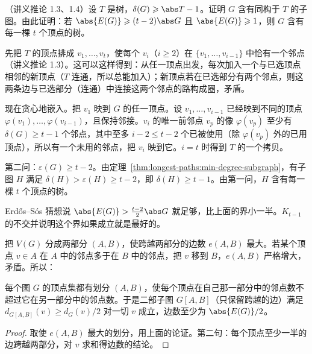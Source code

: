 \begin{workedexample}\label{we:longest-paths:tree-embedding}
（讲义推论 1.3、1.4）设 $T$ 是树，$\delta(G)\geqslant\abs T-1$。证明 $G$ 含有同构于 $T$ 的子图。由此证明：若 $\abs{E(G)}\geqslant(t-2)\abs G$ 且 $\abs{E(G)}\geqslant1$，则 $G$ 含有每一棵 $t$ 个顶点的树。
\end{workedexample}
\begin{solution}
先把 $T$ 的顶点排成 $v_1,\dots,v_t$，使每个 $v_i$（$i\geqslant2$）在 $\{v_1,\dots,v_{i-1}\}$ 中恰有一个邻点（讲义推论 1.3）。这可以这样得到：从任一顶点出发，每次加入一个与已选顶点相邻的新顶点（$T$ 连通，所以总能加入）；新顶点若在已选部分有两个邻点，则这两条边与已选部分（连通）中连接这两个邻点的路构成圈，矛盾。

现在贪心地嵌入。把 $v_1$ 映到 $G$ 的任一顶点。设 $v_1,\dots,v_{i-1}$ 已经映到不同的顶点 $\varphi(v_1),\dots,\varphi(v_{i-1})$，且保持邻接。$v_i$ 的唯一前邻点 $v_p$ 的像 $\varphi(v_p)$ 至少有 $\delta(G)\geqslant t-1$ 个邻点，其中至多 $i-2\leqslant t-2$ 个已被使用（除 $\varphi(v_p)$ 外的已用顶点），所以有一个未用的邻点，把 $v_i$ 映到它。$i=t$ 时得到 $T$ 的一个拷贝。

第二问：$\varepsilon(G)\geqslant t-2$。由定理~\ref{thm:longest-paths:min-degree-subgraph}，有子图 $H$ 满足 $\delta(H)>\varepsilon(H)\geqslant t-2$，即 $\delta(H)\geqslant t-1$。由第一问，$H$ 含有每一棵 $t$ 个顶点的树。
\end{solution}

\begin{remark}
Erdős--Sós 猜想说 $\abs{E(G)}>\frac{t-2}2\abs G$ 就足够，比上面的界小一半。$K_{t-1}$ 的不交并说明这个界如果成立就是最好的。
\end{remark}


把 $V(G)$ 分成两部分 $(A,B)$，使跨越两部分的边数 $e(A,B)$ 最大。若某个顶点 $v\in A$ 在 $A$ 中的邻点多于在 $B$ 中的邻点，把 $v$ 移到 $B$，$e(A,B)$ 严格增大，矛盾。所以：

\begin{lemma}\label{lem:longest-paths:max-cut}
每个图 $G$ 的顶点集都有划分 $(A,B)$，使每个顶点在自己那一部分中的邻点数不超过它在另一部分中的邻点数。于是二部子图 $G[A,B]$（只保留跨越的边）满足 $d_{G[A,B]}(v)\geqslant d_G(v)/2$ 对一切 $v$ 成立，边数至少为 $\abs{E(G)}/2$。
\end{lemma}
\begin{proof}
取使 $e(A,B)$ 最大的划分，用上面的论证。第二句：每个顶点至少一半的边跨越两部分，对 $v$ 求和得边数的结论。
\end{proof}

